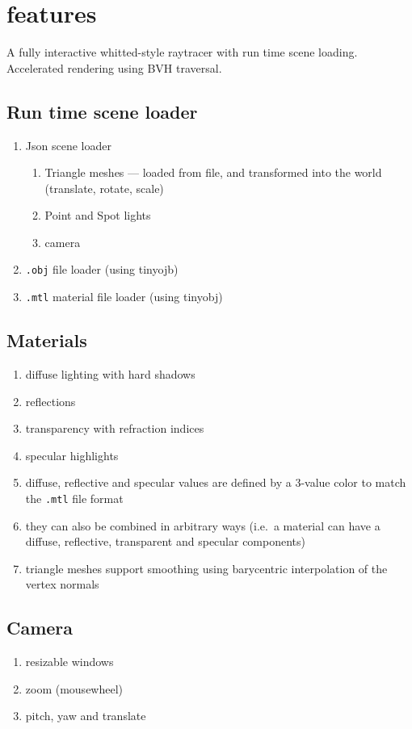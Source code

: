 \section{features}
A fully interactive whitted-style raytracer with run time scene loading. Accelerated rendering using BVH traversal.

\subsection{Run time scene loader}
    \begin{enumerate}
    \item Json scene loader
        \begin{enumerate}
        \item Triangle meshes --- loaded from file, and transformed into the world (translate, rotate, scale)
        \item Point and Spot lights
        \item camera
        \end{enumerate}
    \item \verb|.obj| file loader (using tinyojb)
    \item \verb|.mtl| material file loader (using tinyobj)
    \end{enumerate}

\subsection{Materials}
    \begin{enumerate}
    \item diffuse lighting with hard shadows
    \item reflections
    \item transparency with refraction indices
    \item specular highlights
    \item diffuse, reflective and specular values are defined by a 3-value color to match the \verb|.mtl| file format
    \item they can also be combined in arbitrary ways (i.e.\ a material can have a diffuse, reflective, transparent and specular components)
    \item triangle meshes support smoothing using barycentric interpolation of the vertex normals
    \end{enumerate}

\subsection{Camera}
    \begin{enumerate}
    \item resizable windows
    \item zoom (mousewheel)
    \item pitch, yaw and translate
    \end{enumerate}

